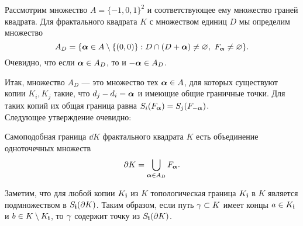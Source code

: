 Рассмотрим множество $A=\{-1,0,1\}^2$ и соответствующее ему множество граней квадрата. 
Для фрактального квадрата $K$ с множеством единиц $D$ мы определим множество 
$$A_D=\{{\bm{\alpha}}\in A\setminus\{(0,0)\}: D\cap(D+{\bm{\alpha}})\neq\varnothing,\ F_{\bm{\alpha}}\neq\varnothing\}.$$ 
Очевидно, что если ${\bm{\alpha}}\in A_D$, то и $-{\bm{\alpha}}\in A_D$.

Итак, множество $A_D$ --- это множество тех ${\bm{\alpha}}\in A$, для которых существуют копии $K_i, K_j$ такие, что $d_j-d_i={\bm{\alpha}}$ и имеющие общие граничные точки. 
Для таких копий их общая граница равна $S_i(F_{\bm{\alpha}})=S_j(F_{-{\bm{\alpha}}})$.\\

Следующее утверждение очевидно:

\begin{proposition}\label{prop:dd}
Самоподобная граница $\dd K$ фрактального квадрата $K$ есть объединение одноточечных множеств
$$\partial K=\bigcup\limits_{{\bm{\alpha}}\in A_D}F_{\bm{\alpha}}.$$
\end{proposition}

Заметим, что для любой копии $K_{\bf{i}}$ из $K$ топологическая граница $K_{\bf{i}}$ в $K$ является подмножеством в 
$S_{\bf{i}}(\partial K)$. 
Таким образом, если путь $\gamma\subset K$ имеет концы $a\in K_{\bf{i}}$ и $b\in K\setminus K_{\bf{i}}$, то $\gamma$ содержит точку из $S_{\bf{i}}(\partial K)$.

